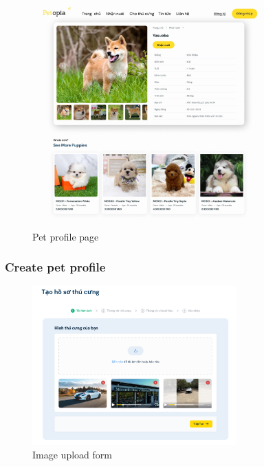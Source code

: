 \begin{figure}[H]
    \centering
    \includegraphics[width=0.8\textwidth]{Figures/pet_detail_ui.jpg}
    \caption{Pet profile page}
\end{figure}

\subsubsection{Create pet profile}

\begin{figure}[H]
    \centering
    \includegraphics[width=0.7\textwidth]{Figures/img_upload_ui.png}
    \caption{Image upload form}
\end{figure}


